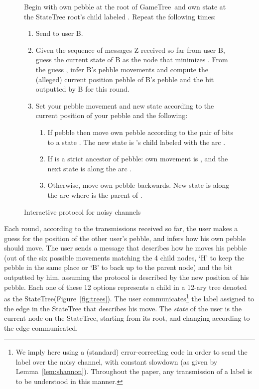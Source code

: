 \documentclass[ letterpaper, 11pt]{article}
\newcommand{\gametree}{\textsf{GameTree}\xspace}
\newcommand{\statetree}{{\textsf{StateTree}}\xspace}
\begin{document}
\begin{figure}[htb]
\begin{framed}
\small
Begin with own pebble at the root of \gametree\ and own state  at the \statetree root's child labeled
.
Repeat the following  times\footnotemark:
\begin{enumerate}
\item Send  to user B.
\item Given the sequence of messages Z received so far from user B, guess the
current state  of B as the node that minimizes .
From the guess , infer
B's pebble movements and compute the (alleged) current position pebble of B's pebble and the bit  outputted by B for this round.
\item Set your pebble movement and new state according to the current position  of your pebble  and the following:
    \begin{enumerate}
    \item If pebble then move own pebble according to the pair of bits
     to a state .
    The new state is 's child labeled with the arc .
    \item If  is a strict ancestor of pebble: own movement is , and the
    next state is along the arc .
    \item Otherwise, move own pebble backwards. New state is along the arc 
    where  is the parent of .
    \end{enumerate}
\end{enumerate}
\end{framed}
\caption{Interactive protocol  for noisy channels~\cite{schulman96}}
\label{alg:protocol}
\end{figure}

Each round, according to the transmissions received so far,
the user makes a guess for the position of the other user's pebble,
and infers how his own pebble should  move.
The user sends a message that describes
how he moves his pebble (out of the six possible movements matching the
4 child nodes, `H' to keep the pebble in the same place or `B' to back up to the parent node) and
the bit outputted by him, assuming the protocol is
described by the new position of his pebble.
Each one of these  12 options represents a child in a 12-ary
tree denoted as the \statetree (Figure~\ref{fig:trees}).
The user communicates\footnote
{We imply here using a (standard) error-correcting code in order to send the label over the
noisy channel, with constant slowdown (as given by Lemma~\ref{lem:shannon}).
Throughout the paper, any transmission of a label is to be understood in this manner.}
the label
assigned to the edge in the \statetree that describes his move. The \emph{state} of the user
is the current node on the \statetree, starting from its root,
and changing according to the edge communicated.
\end{document}
